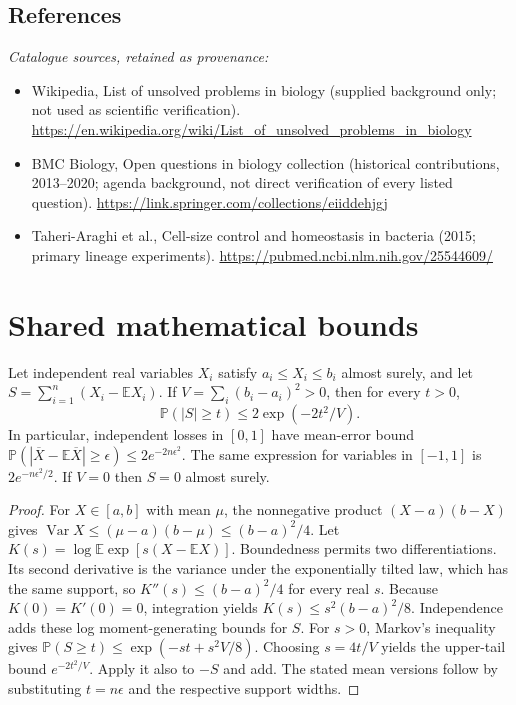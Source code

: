\documentclass[11pt]{article}
\begin{document}
\subsection{References}
\noindent\emph{Catalogue sources, retained as provenance:}
\begin{itemize}
\item Wikipedia, List of unsolved problems in biology (supplied background only; not used as scientific verification). \url{https://en.wikipedia.org/wiki/List_of_unsolved_problems_in_biology}
\item BMC Biology, Open questions in biology collection (historical contributions, 2013--2020; agenda background, not direct verification of every listed question). \url{https://link.springer.com/collections/eiiddehjgj}
\item Taheri-Araghi et al., Cell-size control and homeostasis in bacteria (2015; primary lineage experiments). \url{https://pubmed.ncbi.nlm.nih.gov/25544609/}
\end{itemize}




\section{Shared mathematical bounds}\label{app:bounds}
\begin{lemma}\label{lem:bounded}
Let independent real variables $X_i$ satisfy $a_i\leq X_i\leq b_i$ almost surely,
and let $S=\sum_{i=1}^n(X_i-\mathbb{E} X_i)$. If
$V=\sum_i(b_i-a_i)^2>0$, then for every $t>0$,
\[
 \mathbb{P}(|S|\geq t)\leq 2\exp(-2t^2/V).
\]
In particular, independent losses in $[0,1]$ have mean-error bound
$\mathbb{P}(|\overline X-\mathbb{E}\overline X|\geq\epsilon)
\leq2e^{-2n\epsilon^2}$. The same expression for variables in $[-1,1]$
is $2e^{-n\epsilon^2/2}$. If $V=0$ then $S=0$ almost surely.
\end{lemma}
\begin{proof}
For $X\in[a,b]$ with mean $\mu$, the nonnegative product
$(X-a)(b-X)$ gives
$\operatorname{Var} X\leq(\mu-a)(b-\mu)\leq(b-a)^2/4$.
Let $K(s)=\log\mathbb{E}\exp[s(X-\mathbb{E} X)]$.
Boundedness permits two differentiations. Its second derivative is the variance
under the exponentially tilted law, which has the same support, so
$K''(s)\leq(b-a)^2/4$ for every real $s$.
Because $K(0)=K'(0)=0$, integration yields
$K(s)\leq s^2(b-a)^2/8$.
Independence adds these log moment-generating bounds for $S$.
For $s>0$, Markov's inequality gives
$\mathbb{P}(S\geq t)\leq\exp(-st+s^2V/8)$.
Choosing $s=4t/V$ yields the upper-tail bound $e^{-2t^2/V}$.
Apply it also to $-S$ and add. The stated mean versions follow by substituting
$t=n\epsilon$ and the respective support widths.
\end{proof}
\end{document}
